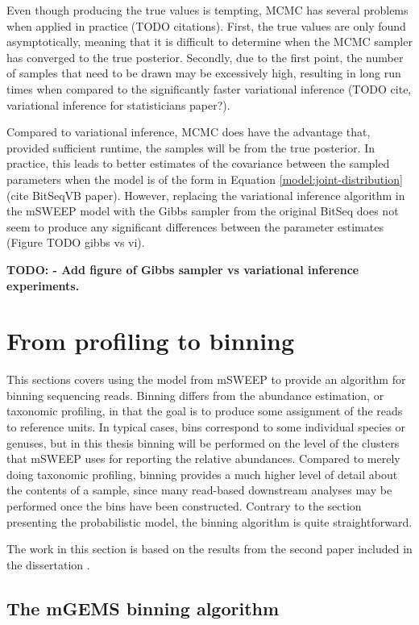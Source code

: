 \documentclass[officiallayout]{tktla}
\begin{document}
Even though producing the true values is tempting, MCMC has several
problems when applied in practice (TODO citations). First, the true
values are only found asymptotically, meaning that it is difficult to
determine when the MCMC sampler has converged to the true
posterior. Secondly, due to the first point, the number of samples
that need to be drawn may be excessively high, resulting in long run
times when compared to the significantly faster variational inference
(TODO cite, variational inference for statisticians paper?).

Compared to variational inference, MCMC does have the advantage that,
provided sufficient runtime, the samples will be from the true
posterior. In practice, this leads to better estimates of the
covariance between the sampled parameters when the model is of the
form in Equation \ref{model:joint-distribution} (cite BitSeqVB
paper). However, replacing the variational inference algorithm in the
mSWEEP model with the Gibbs sampler from the original BitSeq
\citep{glaus2012identifying} does not seem to produce any significant
differences between the parameter estimates (Figure TODO gibbs vs vi).

\textbf{TODO: - Add figure of Gibbs sampler vs variational inference experiments.}

\section{From profiling to binning}
\label{section:binning}

This sections covers using the model from mSWEEP to provide an
algorithm for binning sequencing reads. Binning differs from the
abundance estimation, or taxonomic profiling, in that the goal is to
produce some assignment of the reads to reference units. In typical
cases, bins correspond to some individual species or genuses, but in
this thesis binning will be performed on the level of the clusters
that mSWEEP uses for reporting the relative abundances. Compared to
merely doing taxonomic profiling, binning provides a much higher level
of detail about the contents of a sample, since many read-based
downstream analyses may be performed once the bins have been
constructed. Contrary to the section presenting the probabilistic
model, the binning algorithm is quite straightforward.

The work in this section is based on the results from the second paper
included in the dissertation \citep{maklin_bacterial_2021}.

\subsection{The mGEMS binning algorithm}
\end{document}
